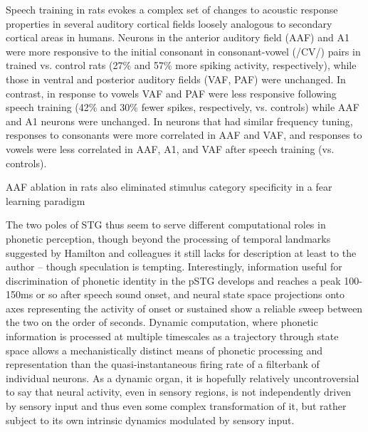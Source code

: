 Speech training in rats evokes a complex set of changes to acoustic response properties in several auditory cortical fields loosely analogous to secondary cortical areas in humans\cite{engineerSpeechTrainingAlters2015a}. Neurons in the anterior auditory field (AAF) and A1 were more responsive to the initial consonant in consonant-vowel (/CV/) pairs in trained vs. control rats (27\% and 57\% more spiking activity, respectively), while those in ventral and posterior auditory fields (VAF, PAF) were unchanged. In contrast, in response to vowels VAF and PAF were less responsive following speech training (42\% and 30\% fewer spikes, respectively, vs. controls) while AAF and A1 neurons were unchanged. In neurons that had similar frequency tuning, responses to consonants were more correlated in AAF and VAF, and responses to vowels were less correlated in AAF, A1, and VAF after speech training (vs. controls).


AAF ablation in rats also eliminated stimulus category specificity in a fear learning paradigm\cite{shiAnteriorAuditoryField2019}

The two poles of STG thus seem to serve different computational roles in phonetic perception, though beyond the processing of temporal landmarks suggested by Hamilton and colleagues it still lacks for description at least to the author -- though speculation is tempting\cite{hamiltonSpatialMapOnset2018a}. Interestingly, information useful for discrimination of phonetic identity in the pSTG develops and reaches a peak 100-150ms or so after speech sound onset\cite{mesgaraniPhoneticFeatureEncoding2014,changCategoricalSpeechRepresentation2010b}, and neural state space projections onto axes representing the activity of onset or sustained show a reliable sweep between the two on the order of seconds. Dynamic computation, where phonetic information is processed at multiple timescales as a trajectory through state space allows a mechanistically distinct means of phonetic processing and representation than the quasi-instantaneous firing rate of a filterbank of individual neurons. As a dynamic organ\cite{brembsBrainDynamicallyActive2020}, it is hopefully relatively uncontroversial to say that neural activity, even in sensory regions, is not independently driven by sensory input and thus even some complex transformation of it, but rather subject to its own intrinsic dynamics modulated by sensory input. 

